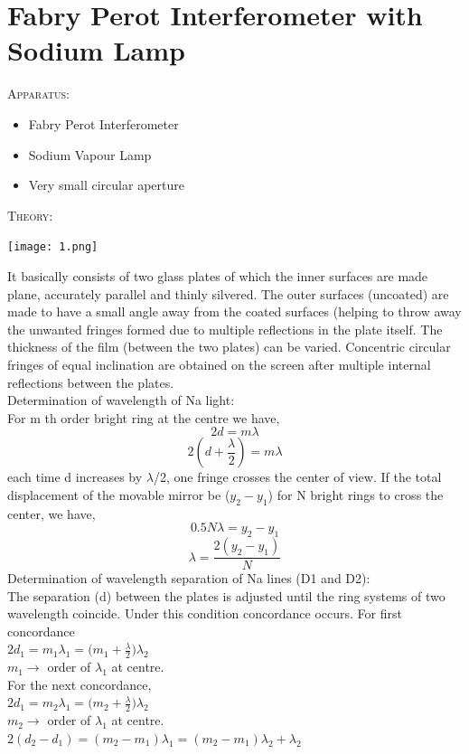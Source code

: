 \documentclass[12pt]{report}
\begin{document}
	\section{Fabry Perot Interferometer with Sodium Lamp}
	\textsc{\large{Apparatus: }}
	\begin{itemize}
		\item Fabry Perot Interferometer
		\item Sodium Vapour Lamp
		\item Very small circular aperture
	\end{itemize}
	\textsc{\large{Theory:}}
	\\
	\begin{center}
		\texttt{[image: 1.png]}
	\end{center}
	It basically consists of two glass plates of which the inner surfaces are made plane, accurately parallel and thinly silvered. The outer surfaces (uncoated) are made to have a small angle away from the coated surfaces (helping to throw away the unwanted fringes formed due to multiple reflections in the plate itself. The thickness of the film (between the two plates) can be varied. Concentric circular fringes of equal inclination are obtained on the screen after multiple internal reflections between the plates.\\
	Determination of wavelength of Na light:\\For m th order bright ring at the centre we have,
	$$2d = m\lambda$$
	$$2(d + \frac{\lambda}{2}) = m\lambda$$
	each time d increases by $\lambda$/2, one fringe crosses the center of view. If the total displacement of the movable mirror be ($y_2-y_1$) for N bright rings to cross the center, we have,
	$$0.5N\lambda = y_2 - y_1$$
	$$\lambda = \frac{2(y_2-y_1)}{N} $$
	Determination of wavelength separation of Na lines (D1 and D2):\\The separation (d) between the plates is adjusted until the ring systems of two wavelength coincide. Under this condition concordance occurs. For first concordance\\
	$2d_1 = m_1\lambda_1 = \big(m_1+\frac{\lambda}{2}\big)\lambda_2$\\
	$m_1\rightarrow$ order of $\lambda_1$ at centre.\\
	For the next concordance,\\
	$2d_1 = m_2\lambda_1 = \big(m_2+\frac{\lambda}{2}\big)\lambda_2$\\
	$m_2\rightarrow$ order of $\lambda_1$ at centre.\\
	$2(d_2-d_1) = (m_2-m_1)\lambda_1 = (m_2-m_1)\lambda_2 + \lambda_2$\\
\end{document}

